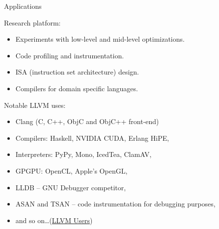 \documentclass[8pt]{beamer}
\begin{document}
\begin{frame}[fragile]{Applications}
  \begin{block}{Research platform:}
    \begin{itemize}
      \item Experiments with low-level and mid-level optimizations.
      \item Code profiling and instrumentation.
      \item ISA (instruction set architecture) design.
      \item Compilers for domain specific languages.
    \end{itemize}
  \end{block}

  \begin{exampleblock}{Notable LLVM uses:}
    \begin{itemize}
      \item Clang (C, C++, ObjC and ObjC++ front-end)
      \item Compilers: Haskell, NVIDIA CUDA, Erlang HiPE,
      \item Interpreters: PyPy, Mono, IcedTea, ClamAV,
      \item GPGPU: OpenCL, Apple's OpenGL,
      \item LLDB -- GNU Debugger competitor,
      \item ASAN and TSAN -- code instrumentation for debugging purposes,
      \item and so on\ldots (\href{http://llvm.org/Users.html}{LLVM Users})
    \end{itemize}
  \end{exampleblock}
\end{frame}
\end{document}
